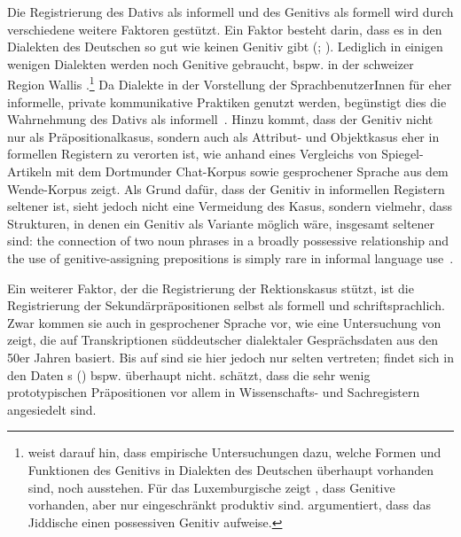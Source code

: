 Die Registrierung des Dativs als informell und des Genitivs als formell wird durch verschiedene weitere Faktoren gestützt. 
Ein Faktor besteht darin, dass es in den Dialekten des Deutschen so gut wie keinen Genitiv gibt (\citealp[s.][437]{Shrier.1965}; \citealp[250]{Scott.2014}). Lediglich in einigen wenigen Dialekten werden noch Genitive gebraucht, bspw. in der schweizer Region Wallis \citep[s.][1243]{Ko.1983}.\footnote{\citet[339]{Scott.2014} weist darauf hin, dass empirische Untersuchungen dazu, welche Formen und Funktionen des Genitivs in Dialekten des Deutschen überhaupt vorhanden sind, noch ausstehen. Für das Luxemburgische zeigt \citet{Dohmer.2018}, dass Genitive vorhanden, aber nur eingeschränkt produktiv sind. \citet{Hoge.2018} argumentiert, dass das Jiddische einen possessiven Genitiv aufweise.} 
Da Dialekte in der Vorstellung der SprachbenutzerInnen für eher informelle, private kommunikative Praktiken genutzt werden, begünstigt dies die Wahrnehmung des Dativs als informell~\citep[s.][221--222]{Maitz2015}. 
Hinzu kommt, dass der Genitiv nicht nur als Präpositionalkasus, sondern auch als Attribut- und Objektkasus eher in formellen Registern zu verorten ist, wie \citet[252]{Scott.2014} anhand eines Vergleichs von Spiegel-Artikeln mit dem Dortmunder Chat-Korpus sowie gesprochener Sprache aus dem Wende-Korpus zeigt. 
Als Grund daf{\"u}r, dass der Genitiv in informellen Registern seltener ist, sieht \citet[s.][276]{Scott.2014} jedoch nicht eine Vermeidung des Kasus, sondern vielmehr, dass Strukturen, in denen ein Genitiv als Variante m{\"o}glich w{\"a}re, insgesamt seltener sind: 
\glqq the connection of two noun phrases in a broadly possessive relationship and the use of genitive-assigning prepositions is simply rare in informal language use\grqq{}~\citep[276]{Scott.2014}.

Ein weiterer Faktor, der die Registrierung der Rektionskasus stützt, ist die Registrierung der Sekundärpräpositionen selbst als formell und schriftsprachlich. 
Zwar kommen sie auch in gesprochener Sprache vor, wie eine Untersuchung von \citet[]{Mikosch1987} zeigt, die auf Transkriptionen süddeutscher dialektaler Gesprächsdaten aus den 50er Jahren basiert. 
Bis auf \wegen{} sind sie hier jedoch nur selten vertreten; \dank{} findet sich in den Daten \citeauthor{Mikosch1987}s (\citeyear[125]{Mikosch1987}) bspw. überhaupt nicht.
\citet[48]{Bene.1975} sch{\"a}tzt, dass die sehr wenig prototypischen Pr{\"a}positionen vor allem in Wissenschafts- und Sachregistern angesiedelt sind. 

